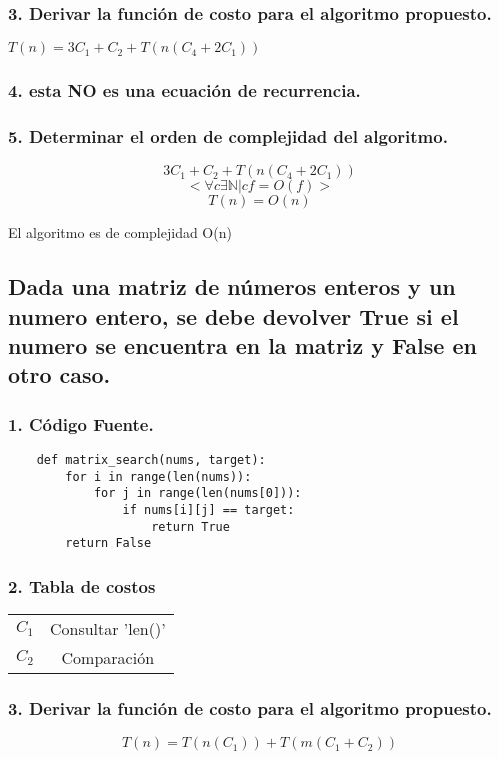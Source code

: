 \documentclass[12pt]{exam}
\begin{document}
\subsubsection*{3. Derivar la función de costo para el algoritmo propuesto.}
$ T(n) = 3C_1 + C_2 + T(n(C_4+2C_1))$
\subsubsection*{4. esta NO es una ecuación de recurrencia.}
\subsubsection*{5. Determinar el orden de complejidad del algoritmo.}
$$ 3C_1 + C_2 + T(n(C_4+2C_1))$$
$$< \forall c \exists \mathbb{N} | cf = O(f) >$$
$$ T(n) = O(n) $$ 

El algoritmo es de complejidad O(n)

\subsection*{Dada una matriz de números enteros y un numero entero, se debe devolver
True si el numero se encuentra en la matriz y False en otro caso.}

\subsubsection*{1. Código Fuente.}

\begin{verbatim}
    def matrix_search(nums, target):
        for i in range(len(nums)):
            for j in range(len(nums[0])):
                if nums[i][j] == target:
                    return True
        return False
\end{verbatim}


\subsubsection*{2. Tabla de costos}
\begin{center}
    \begin{tabular}{||c c||}
        $C_1$ & Consultar 'len()' \\
        $C_2$ & Comparación\\
    \end{tabular}
\end{center}

\subsubsection*{3. Derivar la función de costo para el algoritmo propuesto.}
$$ T(n) = T(n(C_1)) + T(m(C_1+C_2)) $$
\end{document}
